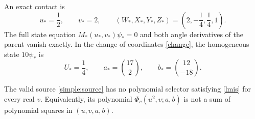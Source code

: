 An exact contact is
\begin{equation}
 u_*=\frac12,\qquad v_*=2,\qquad
 (W_*,X_*,Y_*,Z_*)=\left(2,-\frac14,\frac14,1\right).
 \label{simple:physical-contact}
\end{equation}
The full state equation $M_*(u_*,v_*)\psi_*=0$ and both angle
derivatives of the parent vanish exactly. In the change of coordinates
\eqref{change}, the homogeneous state $10\psi_*$ is
\begin{equation}
 U_*=\frac14,\qquad
 a_* =\binom{17}{2},\qquad b_* =\binom{12}{-18}.
 \label{contact}
\end{equation}

\begin{theorem}\label{thm:obstruction}
The valid source \eqref{simple:source} has no polynomial selector satisfying
\eqref{lmis} for every real $v$. Equivalently, its polynomial
$\Phi_c(u^2,v;a,b)$ is not a sum of polynomial squares in $(u,v,a,b)$.
\end{theorem}
